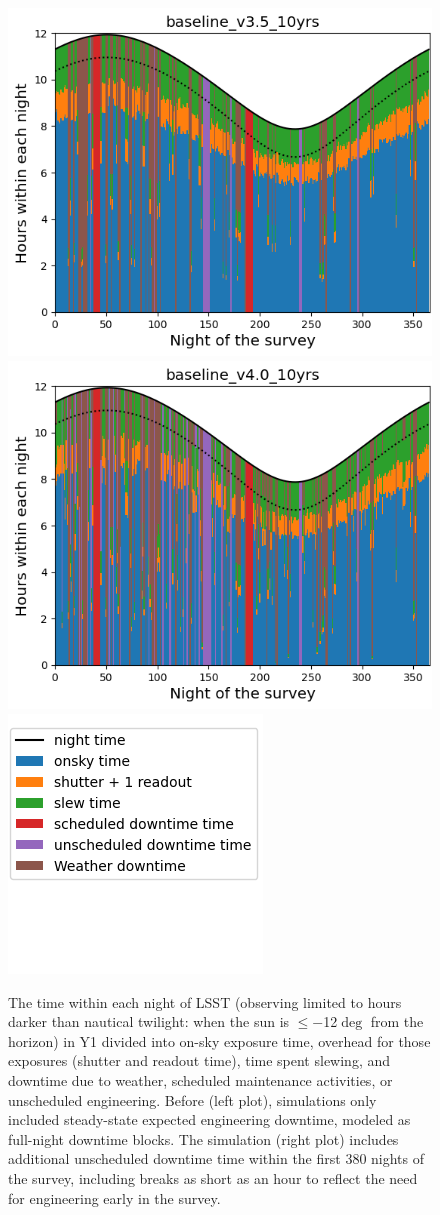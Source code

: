 \begin{itemize}
\begin{figure}[!h]
    \centering
    \includegraphics[width=0.37\linewidth]{figures/downtime_v3_5_year1.png}
    \includegraphics[width=0.37\linewidth]{figures/downtime_v4_0_year1.png}
    \includegraphics[width=0.24\linewidth]{figures/downtime_v4_0_year1_legend.png}
    \caption{The time within each night of LSST (observing limited to hours darker than nautical twilight: when the sun is  \mbox{$\leq-$12$\deg$} from the horizon) in Y1 divided into on-sky exposure time, overhead for those exposures (shutter and readout time), time spent slewing, and downtime due to weather, scheduled maintenance activities, or unscheduled engineering. Before  (left plot), simulations only included steady-state expected engineering downtime, modeled as full-night downtime blocks. The  simulation (right plot) includes additional unscheduled downtime time within the first 380 nights of the survey, including breaks as short as an hour to reflect the need for engineering early in the survey. }
    \label{fig:downtime}
\end{figure}



\end{itemize}
